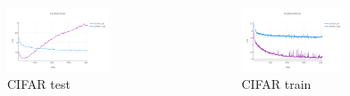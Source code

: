 \documentclass[
	11pt, %
]{beamer}
\begin{document}
\begin{frame}
  
  \begin{columns}[c]
    \begin{column}{.5\textwidth}
    \begin{figure}
        \centering
        \includegraphics[width=0.7\textwidth]{../report/images/CIFAR10_test.png}
        \caption{CIFAR test}
    \end{figure}      
    \end{column}
    \begin{column}{.5\textwidth}
    \begin{figure}
        \centering
        \includegraphics[width=0.7\textwidth]{../report/images/CIFAR10_train.png}
        \caption{CIFAR train}
    \end{figure}
    \end{column}
  \end{columns}

\end{frame}

\end{document}
